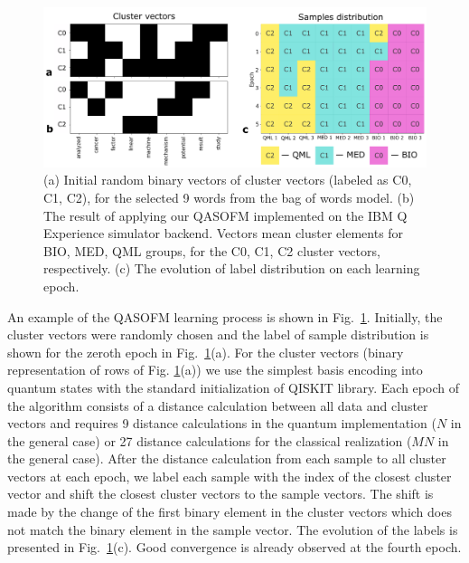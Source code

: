 \documentclass[%
  pra, aps, physrev,
  showkeys,
  twocolumn,
  showpacs,
  superscriptaddress,
  amsmath,amssymb,
  10pt
]{revtex4-2}
\begin{document}
\begin{figure}[t]
  \includegraphics[width=1.85\columnwidth]{convergence.png}
  \caption{
    (a) Initial random binary vectors of cluster vectors (labeled as C0, C1, C2),
    for the selected 9 words from the bag of words model.
    (b) The result of applying our QASOFM implemented on the IBM Q Experience simulator backend.
    Vectors mean cluster elements for BIO, MED, QML groups,
    for the C0, C1, C2 cluster vectors, respectively.
    (c) The evolution of label distribution on each learning epoch.
  }
  \label{convergence}
\end{figure}


An example of the QASOFM learning process is shown in Fig.~\ref{convergence}.
Initially, the cluster vectors were randomly chosen and the label of sample distribution is shown for the zeroth epoch in Fig.~\ref{convergence}(a). For the cluster  vectors (binary representation of rows of Fig. \ref{convergence}(a)) we use the simplest basis encoding into quantum  states with the standard initialization of QISKIT \cite{rathQuantumDataEncoding2024,qiskit} library.
Each epoch of the algorithm consists of a distance calculation between all data and cluster vectors
and requires 9 distance calculations in the  quantum implementation ($N$ in the general case)
or 27 distance calculations for the classical realization
($MN$ in the general case).
After the distance calculation from each sample to all cluster vectors at each epoch, we label each sample with the index of the closest cluster vector
and shift the closest cluster vectors to the sample vectors.
The shift is made by the change of the first binary element in the cluster vectors which does not match the binary element in the sample vector.
The evolution of the labels is presented in Fig.~\ref{convergence}(c).
Good convergence is already observed at the fourth epoch.
\end{document}
